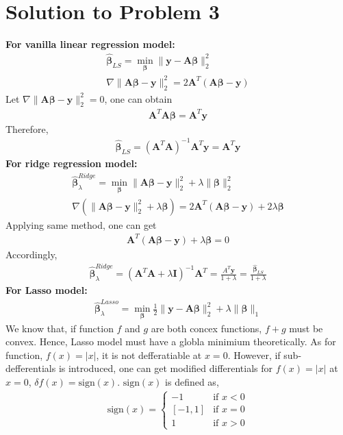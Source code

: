 \documentclass[11pt]{article}
\newcommand{\mtx}[1]{\mathbf{#1}}
\newcommand{\vct}[1]{\mathbf{#1}}
\def \mA {\mtx{A}}
\def \mI {\mtx{I}}
\def \vy {\vct{y}}
\begin{document}
\section*{Solution to Problem 3}
{\bf For vanilla linear regression model:}
\begin{align*}
	\hat{\bm{\beta}}_{LS}=\min_{\bm{\beta}} \|\vy-\mA\bm{\beta}\|_2^2 \\
	\nabla\|\mA\bm{\beta}-\vy\|^{2}_2=2\mA^{T}(\mA\bm{\beta}- \vy)
\end{align*}
Let $\nabla \|\mA\bm{\beta}-\vy \|^{2}_2=0$, one can obtain
\begin{align*}
	\mA^{T}\mA\bm{\beta}=\mA^{T}\vy
\end{align*}
Therefore,
\begin{align}\label{eqn:3:1}
	\hat{\bm{\beta}}_{LS}=(\mA^{T}\mA)^{-1}\mA^{T}\vy=\mA^T\vy
\end{align}
{\bf For ridge regression model:} 
\begin{align*}
\hat{\bm{\beta}}_{\lambda}^{Ridge}=\min_{\bm{\beta}}\|\mA\bm{\beta}-\vy\|^2_2+\lambda\|\bm{\beta}\|^2_2\\
\nabla(\|\mA\bm{\beta}-\vy\|^2_2+\lambda\bm{\beta})=2\mA^{T}(\mA\bm{\beta}-\vy)+2\lambda\bm{\beta}
\end{align*}
Applying same method, one can get
\begin{align*}
	\mA^T(\mA\bm{\beta}-\vy)+\lambda\bm{\beta}=0
\end{align*}
Accordingly,
\begin{align}\label{eqn:3:2}
	\hat{\bm{\beta}}_{\lambda}^{Ridge}=(\mA^{T}\mA+\lambda\mI)^{-1}\mA^{T}=\frac{A^{T}\vy}{1+\lambda}=\frac{\hat{\bm{\beta}}_{LS}}{1+\lambda}
\end{align}
{\bf For Lasso model:}
\begin{align*}
	\hat{\bm{\beta}}_\lambda^{Lasso} =\min_{\bm{\beta}} \frac{1}{2}\|\vy-\mA\bm{\beta}\|_2^2+\lambda \|\bm{\beta}\|_1
\end{align*}
We know that, if function $f$ and $g$ are both concex functions, $f+g$ must be convex. Hence, Lasso model must have a globla minimium theoretically. As for function, $f(x)=|x|$, it is not defferatiable at $x=0$. However, if sub-defferentials is introduced, one can get modified differentials for $f(x)=|x|$ at $x=0$, $\delta f(x)=\text{sign}(x)$. $\text{sign}(x)$ is defined as,
\begin{align}\label{eqn:3:3}
	\text{sign}(x)=
	\begin{cases}
	-1 & \text{if } x<0\\
	[-1,1] & \text{if } x=0\\
	1 & \text{if } x>0
	\end{cases}
\end{align}
\end{document}
